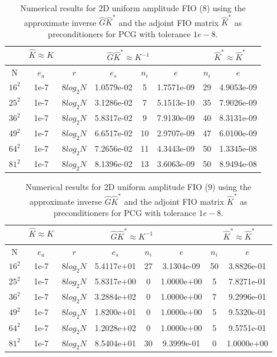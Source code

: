 \documentclass[11pt]{article}
\begin{document}
\begin{table}[!htbp]
\centering
\begin{tabular}{|c|c|c|c|c|c|c|c|}
\hline
\multicolumn{1}{c|}{}& \multicolumn{1}{c|}{$\hat{K} \approx K$} & \multicolumn{4}{c|}{$\hat{G}\hat{K}^{*}\approx K^{-1}$}& \multicolumn{2}{c|}{$\hat{K}^{*} \approx \hat{K}^{*}$}\\
\hline
N & $e_{a}$ & $r$ & $e_{s}$ & $n_{i}$ & $e$ & $n_{i}$ & $e$ \\ 
\hline
$16^2$ & 1e-7 & $8 log_{2}N$ & 1.0579e-02 & 5 & 1.7571e-09 & 29 & 4.9053e-09 \\
\hline
$25^2$ & 1e-7 & $8 log_{2}N$ & 3.1286e-02 & 7 & 5.1513e-10 & 35 & 7.9026e-09 \\
\hline
$36^2$ & 1e-7 & $8 log_{2}N$ & 5.8317e-02 & 9 & 7.9130e-09 & 40 & 8.3131e-09 \\
\hline
$49^2$ & 1e-7 & $8 log_{2}N$ & 6.6517e-02 & 10 & 2.9707e-09 & 47 & 6.0100e-09 \\
\hline
$64^2$ & 1e-7 & $8 log_{2}N$ & 7.2656e-02 & 11 & 4.3443e-09 & 50 & 1.3345e-08 \\
\hline
$81^2$ & 1e-7 & $8 log_{2}N$ & 8.1396e-02 & 13 & 3.6063e-09 & 50 & 8.9494e-08 \\

\end{tabular}

\caption{Numerical results for 2D uniform amplitude FIO (8) using the approximate inverse $\hat{G}\hat{K}^{*}$ and the adjoint FIO matrix $\hat{K}^{*}$ as preconditioners for PCG with tolerance $1e-8$.}
\label{2d-k3f}
\end{table}


\begin{table}[!htbp]
\centering
\begin{tabular}{|c|c|c|c|c|c|c|c|}
\hline
\multicolumn{1}{c|}{}& \multicolumn{1}{c|}{$\hat{K} \approx K$} & \multicolumn{4}{c|}{$\hat{G}\hat{K}^{*}\approx K^{-1}$}& \multicolumn{2}{c|}{$\hat{K}^{*} \approx \hat{K}^{*}$}\\
\hline
N & $e_{a}$ & $r$ & $e_{s}$ & $n_{i}$ & $e$ & $n_{i}$ & $e$ \\ 
\hline
$16^2$ & 1e-7 & $8 log_{2}N$ & 5.4117e+01 & 27 & 3.1304e-09 & 50 & 3.8826e-01 \\
\hline
$25^2$ & 1e-7 & $8 log_{2}N$ & 5.8317e+00 & 0 & 1.0000e+00 & 5 & 7.8271e-01 \\
\hline
$36^2$ & 1e-7 & $8 log_{2}N$ & 3.2884e+02 & 0 & 1.0000e+00 & 7 & 9.2996e-01 \\
\hline
$49^2$ & 1e-7 & $8 log_{2}N$ & 1.8200e+01 & 0 & 1.0000e+00 & 5 & 9.5320e-01 \\
\hline
$64^2$ & 1e-7 & $8 log_{2}N$ & 1.2028e+02 & 0 & 1.0000e+00 & 5 & 9.5751e-01 \\
\hline
$81^2$ & 1e-7 & $8 log_{2}N$ & 8.5404e+01 & 30 & 9.3999e-01 & 0 & 1.0000e+00 \\
\end{tabular}

\caption{Numerical results for 2D uniform amplitude FIO (9) using the approximate inverse $\hat{G}\hat{K}^{*}$ and the adjoint FIO matrix $\hat{K}^{*}$ as preconditioners for PCG with tolerance $1e-8$.}
\label{2d-k4f}
\end{table}

 

\end{document}
